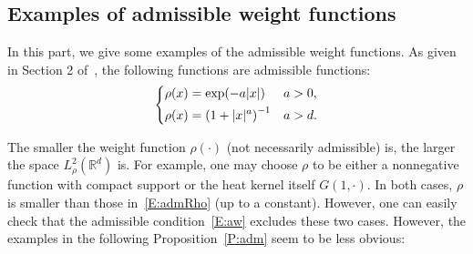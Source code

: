 \documentclass[sn-mathphys]{sn-jnl}%
\renewcommand{\R}{\mathbb{R}}
\numberwithin{equation}{section}
\theoremstyle{thmstyleone}%
\theoremstyle{thmstyletwo}%
\theoremstyle{thmstylethree}%
\begin{document}
\subsection{Examples of admissible weight functions}\label{SS:Weight}

In this part, we give some examples of the admissible weight functions. As given in Section 2
of~\cite{tessitore.zabczyk:98:invariant}, the following functions are admissible functions:
\begin{equation}\label{E:admRho}
\begin{dcases}
  \rho(x) = \exp(-a\lvert x \rvert)               & a>0, \\
  \rho(x) = \left(1+\lvert x \rvert^a\right)^{-1} & a>d.
\end{dcases}
\end{equation}

The smaller the weight function $\rho(\cdot)$ (not necessarily admissible) is, the larger the space
$L_\rho^2(\R^d)$ is. For example, one may choose $\rho$ to be either a nonnegative function with
compact support or the heat kernel itself $G(1,\cdot)$. In both cases, $\rho$ is smaller than those
in~\eqref{E:admRho} (up to a constant). However, one can easily check that the admissible
condition~\eqref{E:aw} excludes these two cases. However, the examples in the following
Proposition~\ref{P:adm} seem to be less obvious:
\end{document}
